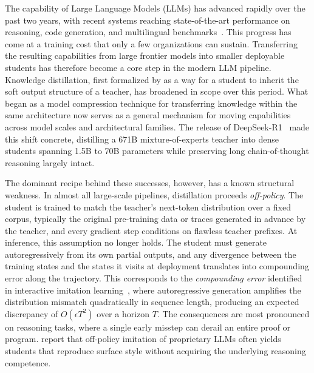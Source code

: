 \documentclass{article} %
\begin{document}
The capability of Large Language Models (LLMs) has advanced rapidly over the past two years, with recent systems reaching state-of-the-art performance on reasoning, code generation, and multilingual benchmarks~\citep{2505.09388,2501.12948,2408.00118}. This progress has come at a training cost that only a few organizations can sustain. Transferring the resulting capabilities from large frontier models into smaller deployable students has therefore become a core step in the modern LLM pipeline. Knowledge distillation, first formalized by \citet{hinton2015distilling} as a way for a student to inherit the soft output structure of a teacher, has broadened in scope over this period. What began as a model compression technique for transferring knowledge within the same architecture now serves as a general mechanism for moving capabilities across model scales and architectural families. The release of DeepSeek-R1~\citep{2501.12948} made this shift concrete, distilling a 671B mixture-of-experts teacher into dense students spanning 1.5B to 70B parameters while preserving long chain-of-thought reasoning largely intact.

The dominant recipe behind these successes, however, has a known structural weakness. In almost all large-scale pipelines, distillation proceeds \emph{off-policy}. The student is trained to match the teacher's next-token distribution over a fixed corpus, typically the original pre-training data or traces generated in advance by the teacher, and every gradient step conditions on flawless teacher prefixes. At inference, this assumption no longer holds. The student must generate autoregressively from its own partial outputs, and any divergence between the training states and the states it visits at deployment translates into compounding error along the trajectory. This corresponds to the \emph{compounding error} identified in interactive imitation learning~\citep{ross2011reduction}, where autoregressive generation amplifies the distribution mismatch quadratically in sequence length, producing an expected discrepancy of $O(\epsilon T^2)$ over a horizon $T$. The consequences are most pronounced on reasoning tasks, where a single early misstep can derail an entire proof or program. \citet{2305.15717} report that off-policy imitation of proprietary LLMs often yields students that reproduce surface style without acquiring the underlying reasoning competence.
\end{document}
